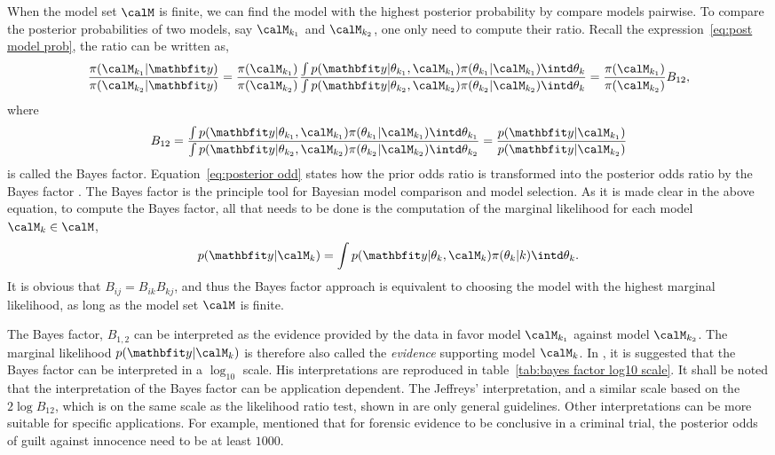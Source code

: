 When the model set $\calM$ is finite, we can find the model with the highest
posterior probability by compare models pairwise. To compare the posterior
probabilities of two models, say $\calM_{k_1}$ and $\calM_{k_2}$, one only
need to compute their ratio. Recall the expression~\eqref{eq:post model prob},
the ratio can be written as,
\begin{equation}
  \frac{\pi(\calM_{k_1}|\data)}{\pi(\calM_{k_2}|\data)}
  = \frac{\pi(\calM_{k_1})}{\pi(\calM_{k_2})} \frac
  {\int p(\data|\theta_{k_1},\calM_{k_1})\pi(\theta_{k_1}|\calM_{k_1})
      \intd\theta_k}
  {\int p(\data|\theta_{k_2},\calM_{k_2})\pi(\theta_{k_2}|\calM_{k_2})
      \intd\theta_k}
  = \frac{\pi(\calM_{k_1})}{\pi(\calM_{k_2})}B_{12},
  \label{eq:posterior odd}
\end{equation}
where
\begin{equation}
  B_{12} = \frac
  {\int p(\data|\theta_{k_1},\calM_{k_1})\pi(\theta_{k_1}|\calM_{k_1})
      \intd\theta_{k_1}}
  {\int p(\data|\theta_{k_2},\calM_{k_2})\pi(\theta_{k_2}|\calM_{k_2})
      \intd\theta_{k_2}}
    = \frac{p(\data|\calM_{k_1})}{p(\data|\calM_{k_2})}
  \label{eq:bayes factor}
\end{equation}
is called the Bayes factor. Equation~\eqref{eq:posterior odd} states how the
prior odds ratio is transformed into the posterior odds ratio by the Bayes
factor \cite{Kass:1995vb}. The Bayes factor is the principle tool for
Bayesian model comparison and model selection. As it is made clear in the
above equation, to compute the Bayes factor, all that needs to be done is the
computation of the marginal likelihood for each model $\calM_k\in\calM$,
\begin{equation}
  p(\data|\calM_k) =
  \int p(\data|\theta_k,\calM_k)\pi(\theta_k|k)\intd\theta_k.
\end{equation}
It is obvious that $B_{ij} = B_{ik} B_{kj}$, and thus the Bayes
factor approach is equivalent to choosing the model with the highest marginal
likelihood, as long as the model set $\calM$ is finite.

The Bayes factor, $B_{1,2}$ can be interpreted as the evidence provided by the
data in favor model $\calM_{k_1}$ against model $\calM_{k_2}$. The marginal
likelihood $p(\data|\calM_k)$ is therefore also called the \emph{evidence}
supporting model $\calM_k$. In \cite{Jeffreys:1961ua}, it is suggested that
the Bayes factor can be interpreted in a $\log_{10}$ scale. His
interpretations are reproduced in table~\ref{tab:bayes factor log10 scale}. It
shall be noted that the interpretation of the Bayes factor can be application
dependent. The Jeffreys' interpretation, and a similar scale based on the
$2\log B_{12}$, which is on the same scale as the likelihood ratio test, shown
in \cite{Kass:1995vb} are only general guidelines. Other interpretations can
be more suitable for specific applications. For example, \cite{Kass:1995vb}
mentioned that for forensic evidence to be conclusive in a criminal trial, the
posterior odds of guilt against innocence need to be at least $1000$.

